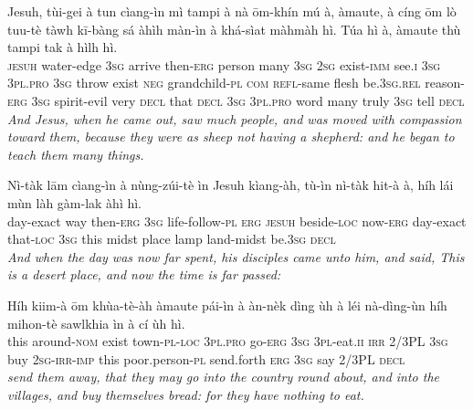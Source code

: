 \documentclass[11pt,a4paper]{article}
\begin{document}
\begin{exe}
\gll Jesuh, tùi-gei à tun cìang-ìn mì tampi à nà ōm-khín mú à, àmaute, à cíng ōm lò tuu-tè tàwh kī-bàng sá àhìh màn-ìn à khá-sìat màhmàh hì. Túa hì à, àmaute thù tampi tak à hìlh hì. \\
     \textsc{jesuh} water-edge \textsc{3sg} arrive then-\textsc{erg} person many \textsc{3sg} \textsc{2sg} exist-\textsc{imm} see.\textsc{i} \textsc{3sg} \textsc{3pl}.\textsc{pro} \textsc{3sg} throw exist \textsc{neg} grandchild-\textsc{pl} \textsc{com} \textsc{refl}-same flesh be.\textsc{3sg}.\textsc{rel} reason-\textsc{erg} \textsc{3sg} spirit-evil very \textsc{decl} that \textsc{decl} \textsc{3sg} \textsc{3pl}.\textsc{pro} word many truly \textsc{3sg} tell \textsc{decl} \\
\glt \textcolor{kjvcolor}{\textit{And Jesus, when he came out, saw much people, and was moved with compassion toward them, because they were as sheep not having a shepherd: and he began to teach them many things.}}

\gll Nì-tàk lām cìang-ìn à nùng-zúi-tè ìn Jesuh kìang-àh, tù-ìn nì-tàk hit-à à, híh lái mùn làh gàm-lak àhì hì. \\
     day-exact way then-\textsc{erg} \textsc{3sg} life-follow-\textsc{pl} \textsc{erg} \textsc{jesuh} beside-\textsc{loc} now-\textsc{erg} day-exact that-\textsc{loc} \textsc{3sg} this midst place lamp land-midst be.\textsc{3sg} \textsc{decl} \\
\glt \textcolor{kjvcolor}{\textit{And when the day was now far spent, his disciples came unto him, and said, This is a desert place, and now the time is far passed:}}

\gll Híh kiim-à ōm khùa-tè-àh àmaute pái-ìn à àn-nèk dìng ùh à léi nà-dìng-ùn híh mihon-tè sawlkhia ìn à cí ùh hì. \\
     this around-\textsc{nom} exist town-\textsc{pl}-\textsc{loc} \textsc{3pl}.\textsc{pro} go-\textsc{erg} \textsc{3sg} \textsc{3pl}-eat.\textsc{ii} \textsc{irr} 2/3PL \textsc{3sg} buy \textsc{2sg}-\textsc{irr}-\textsc{imp} this poor.person-\textsc{pl} send.forth \textsc{erg} \textsc{3sg} say 2/3PL \textsc{decl} \\
\glt \textcolor{kjvcolor}{\textit{send them away, that they may go into the country round about, and into the villages, and buy themselves bread: for they have nothing to eat.}}


\end{exe}
\end{document}
